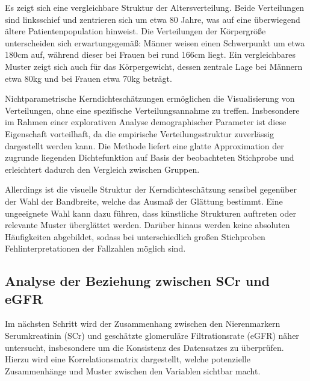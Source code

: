 \documentclass[a4paper,12pt]{article}
\begin{document}
Es zeigt sich eine vergleichbare Struktur der Altersverteilung. Beide Verteilungen sind linksschief und zentrieren sich um etwa 80 Jahre, was auf eine überwiegend ältere Patientenpopulation hinweist. Die Verteilungen der Körpergröße unterscheiden sich erwartungsgemäß: Männer weisen einen Schwerpunkt um etwa 180cm auf, während dieser bei Frauen bei rund 166cm liegt. Ein vergleichbares Muster zeigt sich auch für das Körpergewicht, dessen zentrale Lage bei Männern etwa 80kg und bei Frauen etwa 70kg beträgt.

Nichtparametrische Kerndichteschätzungen ermöglichen die Visualisierung von Verteilungen, ohne eine spezifische Verteilungsannahme zu treffen. Insbesondere im Rahmen einer explorativen Analyse demographischer Parameter ist diese Eigenschaft vorteilhaft, da die empirische Verteilungsstruktur zuverlässig dargestellt werden kann. Die Methode liefert eine glatte Approximation der zugrunde liegenden Dichtefunktion auf Basis der beobachteten Stichprobe und erleichtert dadurch den Vergleich zwischen Gruppen. 

Allerdings ist die visuelle Struktur der Kerndichteschätzung sensibel gegenüber der Wahl der Bandbreite, welche das Ausmaß der Glättung bestimmt. Eine ungeeignete Wahl kann dazu führen, dass künstliche Strukturen auftreten oder relevante Muster überglättet werden. Darüber hinaus werden keine absoluten Häufigkeiten abgebildet, sodass bei unterschiedlich großen Stichproben Fehlinterpretationen der Fallzahlen möglich sind. \\


\subsection{Analyse der Beziehung zwischen SCr und eGFR}\label{sec:ABSe}
Im nächsten Schritt wird der Zusammenhang zwischen den Nierenmarkern Serumkreatinin (SCr) und geschätzte glomeruläre Filtrationsrate (eGFR) näher untersucht, insbesondere um die Konsistenz des Datensatzes zu überprüfen. Hierzu wird eine Korrelationsmatrix dargestellt, welche potenzielle Zusammenhänge und Muster zwischen den Variablen sichtbar macht. 

%  
\end{document}
